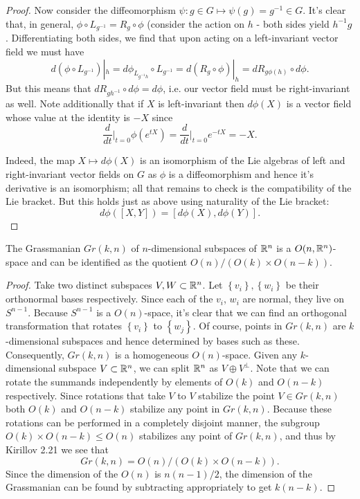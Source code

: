 \documentclass{../../mathnotes}
\begin{document}
\begin{proof}
    Now consider the diffeomorphism $\psi:g\in G\mapsto\psi(g)=g^{-1}\in G$. 
    It's clear that, in general, $\phi\circ L_{g^{-1}}=R_g\circ\phi$ (consider the action on $h$ - both sides yield $h^{-1}g$. Differentiating both sides,
    we find that upon acting on a left-invariant vector field we must have
    \[d(\phi\circ L_{g^{-1}})|_h=d\phi_{L_{g^{-1}h}}\circ L_{g^{-1}}=d(R_g\circ \phi)|_h=dR_{g\phi(h)}\circ d\phi.\]
    But this means that $dR_{gh^{-1}}\circ d\phi=d\phi$, i.e. our vector field must be right-invariant as well. 
    Note additionally that if $X$ is left-invariant then $d\phi(X)$ is a vector field whose value at the identity is $-X$ since
    \[\frac{d}{dt}\bigg|_{t=0}\phi(e^{tX})=\frac{d}{dt}\bigg|_{t=0}e^{-tX}=-X.\]
    
    Indeed, the map $X\mapsto d\phi(X)$ is an isomorphism of the Lie algebras of left and right-invariant vector fields on $G$
    as $\phi$ is a diffeomorphism and hence it's derivative is an isomorphism; all that remains to check is the compatibility of the
    Lie bracket. But this holds just as above using naturality of the Lie bracket:
    \[d\phi([X,Y])=[d\phi(X),d\phi(Y)].\]
\end{proof}

\begin{prop}
    The Grassmanian $Gr(k,n)$ of $n$-dimensional subspaces of $\mathbb{R}^n$ is a $O(n,\mathbb{R}^n)$-space and can be identified as the quotient
    $O(n)/\left( O(k)\times O(n-k) \right)$.
\end{prop}
\begin{proof}
    Take two distinct subspaces $V,W\subset\mathbb{R}^n$. Let $\left\{ v_i \right\},\left\{ w_i \right\}$ be their orthonormal bases respectively.
    Since each of the $v_i$, $w_i$ are normal, they live on $S^{n-1}$. Because $S^{n-1}$ is a $O(n)$-space, it's clear that we can find
    an orthogonal transformation that rotates $\left\{ v_i \right\}$ to $\left\{ w_j \right\}$. Of course, points in $Gr(k,n)$
    are $k$-dimensional subspaces and hence determined by bases such as these. Consequently, $Gr(k,n)$ is a homogeneous $O(n)$-space.
    Given any $k$-dimensional subspace $V\subset\mathbb{R}^n$, we can split $\mathbb{R}^n$ as $V\oplus V^\perp$. Note that we can rotate the summands independently
    by elements of $O(k)$ and $O(n-k)$ respectively. Since rotations that take $V$ to $V$ stabilize the point $V\in Gr(k,n)$ both $O(k)$ and
    $O(n-k)$ stabilize any point in $Gr(k,n)$. Because these rotations can be performed in a completely disjoint manner, the subgroup
    $O(k)\times O(n-k)\leqslant O(n)$ stabilizes any point of $Gr(k,n)$, and thus by Kirillov 2.21 we see that
    \[Gr(k,n)=O(n)/\left( O(k)\times O(n-k) \right).\]
    Since the dimension of the $O(n)$ is $n(n-1)/2$, the dimension of the Grassmanian can be found by subtracting appropriately to get $k(n-k)$.
\end{proof}
\end{document}
